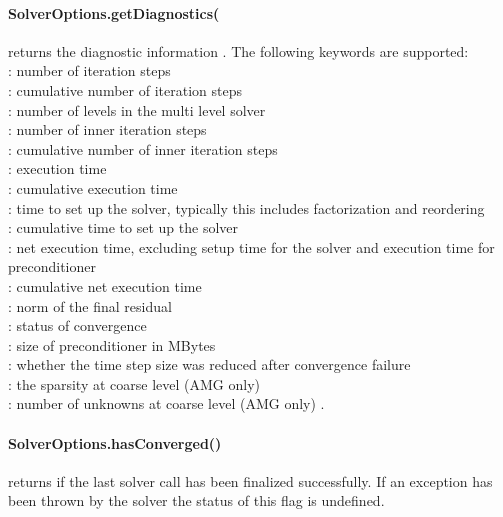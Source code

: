 \paragraph{SolverOptions.getDiagnostics(
}
returns the diagnostic information . The following keywords are
supported:\\
 : number of iteration steps\\
 : cumulative number of iteration steps\\
 : number of levels in the multi level solver\\
 : number of inner iteration steps\\
 : cumulative number of inner iteration steps\\
 : execution time\\
 : cumulative execution time\\
 : time to set up the solver, typically this includes
 factorization and reordering\\
 : cumulative time to set up the solver\\
 : net execution time, excluding setup time for the solver
 and execution time for preconditioner\\
 : cumulative net execution time\\
 : norm of the final residual\\
 : status of convergence\\
 : size of preconditioner in MBytes \\
 : whether the time step size was reduced after convergence failure \\
 : the sparsity at coarse level (AMG only) \\
 : number of unknowns at coarse level (AMG only) .


\paragraph{SolverOptions.hasConverged()}
returns \True if the last solver call has been finalized successfully.
If an exception has been thrown by the solver the status of this flag is undefined.



